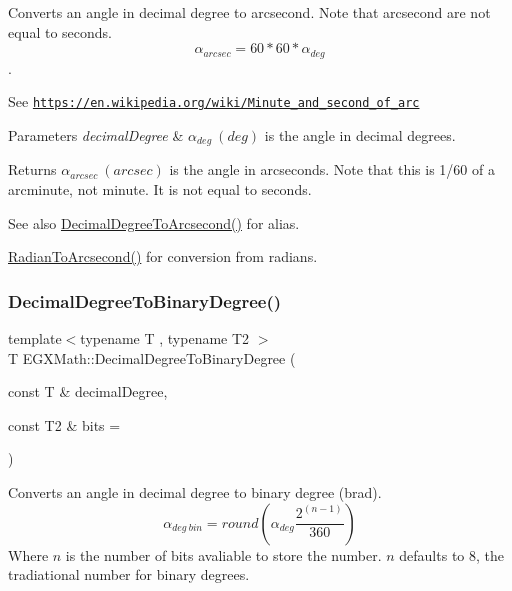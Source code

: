 Converts an angle in decimal degree to arcsecond. Note that arcsecond are not equal to seconds. \[\alpha_{arcsec}=60 * 60 * \alpha_{deg}\]. 

See \href{https://en.wikipedia.org/wiki/Minute_and_second_of_arc}{\tt https\+://en.\+wikipedia.\+org/wiki/\+Minute\+\_\+and\+\_\+second\+\_\+of\+\_\+arc} 
\begin{DoxyParams}{Parameters}
{\em decimal\+Degree} & $\alpha_{deg}\ (deg)$ is the angle in decimal degrees. \\
\hline
\end{DoxyParams}
\begin{DoxyReturn}{Returns}
$\alpha_{arcsec}\ (arcsec)$ is the angle in arcseconds. Note that this is 1/60 of a arcminute, not minute. It is not equal to seconds. 
\end{DoxyReturn}
\begin{DoxySeeAlso}{See also}
\mbox{\hyperlink{group___e_g_x_math-_angle_conversions-_decimal_degree_gab9d5635a6e35127b5245978aba508962}{Decimal\+Degree\+To\+Arcsecond()}} for alias. 

\mbox{\hyperlink{group___e_g_x_math-_angle_conversions-_radian_ga2f952f6675a0fc54bf72bfe4e3d2664a}{Radian\+To\+Arcsecond()}} for conversion from radians. 
\end{DoxySeeAlso}
\mbox{\label{group___e_g_x_math-_angle_conversions-_decimal_degree_gaceec7ae7988c7f342d0b0fa6940720a1}} 
\subsubsection{\texorpdfstring{Decimal\+Degree\+To\+Binary\+Degree()}{DecimalDegreeToBinaryDegree()}}
{\footnotesize\ttfamily template$<$typename T , typename T2 $>$ \\
T E\+G\+X\+Math\+::\+Decimal\+Degree\+To\+Binary\+Degree (\begin{DoxyParamCaption}\item[{const T \&}]{decimal\+Degree,  }\item[{const T2 \&}]{bits = {} }\end{DoxyParamCaption})}



Converts an angle in decimal degree to binary degree (brad). \[\alpha_{deg\ bin}=round(\alpha_{deg}\frac{2^(n-1)}{360})\] Where $n$ is the number of bits avaliable to store the number. $n$ defaults to 8, the tradiational number for binary degrees. 

